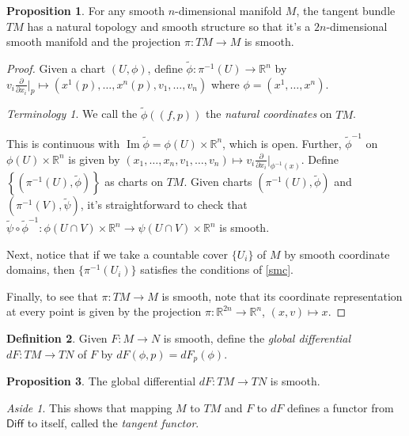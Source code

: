 \documentclass[10pt,letterpaper,cm]{nupset}
\theoremstyle{definition}
\newtheorem{definition}{Definition}[subsection]
\theoremstyle{theorem}
\newtheorem{prop}[definition]{Proposition}
\theoremstyle{remark}
\newtheorem*{aside}{Aside}
\newtheorem*{term}{Terminology}
\DeclareMathOperator{\Ima}{Im}
\newcommand{\R}{\mathbb R}
\newcommand{\1}{\mathbf{1}}
\newcommand{\0}{\vec 0}
\begin{document}
\begin{prop}
For any smooth $n$-dimensional manifold $M$, the tangent bundle $TM$ has a natural topology and smooth structure so that it's a $2n$-dimensional smooth manifold and the projection $\pi : TM \to M$ is smooth.
\end{prop}
\begin{proof}
Given a chart $(U, \phi)$, define $\tilde{\phi}: \pi^{-1}(U) \to \R^n$ by $v_i\frac{\partial}{\partial{x_i}}\bigr\rvert_p \mapsto (x^1(p), \ldots, x^n(p), v_1, \ldots, v_n)$ where $\phi = (x^1, \ldots, x^n)$. 
\begin{term}
We call the $\tilde{\phi}\left((f, p)\right)$ the \textit{natural coordinates} on $TM$.
\end{term}
This is continuous with $\Ima \tilde{\phi} = \phi(U) \times \R^n$, which is open. Further, $\tilde{\phi}^{-1}$ on $\phi(U) \times \R^n$ is given by $(x_1, \ldots, x_n, v_1, \ldots, v_n)\mapsto v_i \frac{\partial}{\partial{x_i}}\bigr\rvert_{\phi^{-1}(x)}$. Define $\left\{(\pi^{-1}(U), \tilde{\phi})\right\}$ as charts on $TM$. Given charts $\left(\pi^{-1}(U), \tilde{\phi}\right)$ and $\left(\pi^{-1}(V), \tilde{\psi}\right)$, it's straightforward to check that $\tilde{\psi} \circ \tilde{\phi}^{-1}: \phi(U \cap V)\times \R^n \to \psi(U \cap V)\times \R^n$ is smooth.

\medskip


Next, notice that if we take a countable cover $\{U_i\}$ of $M$ by smooth coordinate domains, then $\{\pi^{-1}(U_i)\}$ satisfies the conditions of \cref{smc}.

\medskip


Finally, to see that $\pi : TM \to M$ is smooth, note that its coordinate representation at every point is given by the projection $\pi:\R^{2n} \to \R^n$, $(x,v) \mapsto x$.
\end{proof}

\begin{definition}
Given $F: M \to N$ is smooth, define the \textit{global differential} $dF: TM \to TN$ of $F$ by $dF(\phi, p) = dF_p(\phi)$.
\end{definition}

\begin{prop}
The global differential $dF: TM \to TN$ is smooth.
\end{prop}

\begin{aside}
This shows that mapping $M$ to $TM$ and $F$ to $dF$ defines a functor from $\mathsf{Diff}$ to itself, called the \textit{tangent functor}.
\end{aside}
\end{document}
